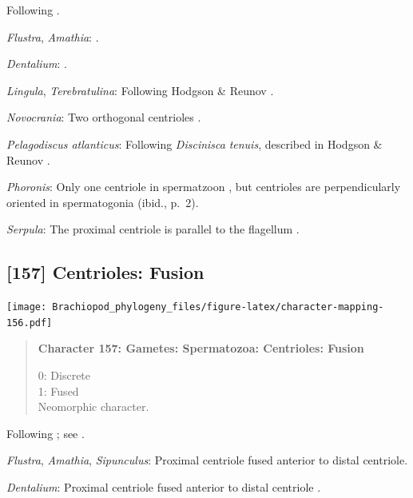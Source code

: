 \documentclass[openany]{book}
\begin{document}
Following \citet{Hodgson1994Ultrastructureof}.

\hypertarget{Amathia-coding-156}{}
\emph{Flustra}, \emph{Amathia}: \citep{Franzen1981}.

\hypertarget{Dentalium-coding-156}{}
\emph{Dentalium}: \citet{DufresneDube1983}.

\hypertarget{Lingula-coding-156}{}
\emph{Lingula}, \emph{Terebratulina}: Following Hodgson \& Reunov
\citeyearpar{Hodgson1994Ultrastructureof}.

\hypertarget{Novocrania-coding-156}{}
\emph{Novocrania}: Two orthogonal centrioles
\citep{Afzelius1978Finestructure}.

\hypertarget{Pelagodiscus_atlanticus-coding-156}{}
\emph{Pelagodiscus atlanticus}: Following \emph{Discinisca}
\emph{tenuis}, described in Hodgson \& Reunov
\citeyearpar{Hodgson1994Ultrastructureof}.

\hypertarget{Phoronis-coding-156}{}
\emph{Phoronis}: Only one centriole in spermatzoon
\citep[p.~7]{Reunov2004Ultrastructuralstudy}, but centrioles are
perpendicularly oriented in spermatogonia (ibid., p.~2).

\hypertarget{Serpula-coding-156}{}
\emph{Serpula}: The proximal centriole is parallel to the flagellum
\citep{Gherardi2011}.

\subsection*{{[}157{]} Centrioles: Fusion}\label{centrioles-fusion}

\texttt{[image: Brachiopod\_phylogeny\_files/figure-latex/character-mapping-156.pdf]}

\begin{quote}
\textbf{Character 157: Gametes: Spermatozoa: Centrioles: Fusion}

0: Discrete\\
1: Fused\\
Neomorphic character.
\end{quote}

Following \citet{Smith2012}; see \citet{BucklandNicks2008}.

\hypertarget{Amathia-coding-157}{}
\emph{Flustra}, \emph{Amathia}, \emph{Sipunculus}: Proximal centriole
fused anterior to distal centriole.

\hypertarget{Dentalium-coding-157}{}
\emph{Dentalium}: Proximal centriole fused anterior to distal centriole
\citep{DufresneDube1983}.
\end{document}
